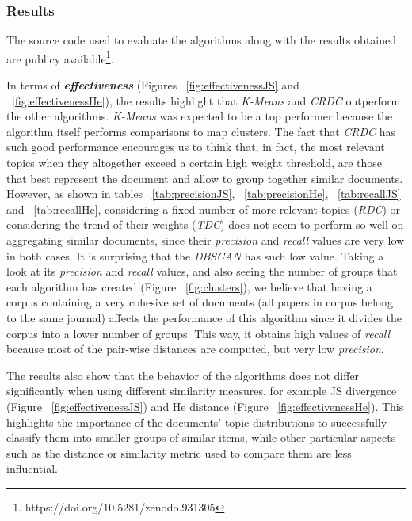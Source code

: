 \subsubsection{Results}
\label{sec:clustering-results}

The source code used to evaluate the algorithms along with the results obtained are publicy available\footnote{https://doi.org/10.5281/zenodo.931305}.

In terms of \textbf{\textit{effectiveness}} (Figures ~\ref{fig:effectivenessJS} and ~\ref{fig:effectivenessHe}), the results highlight that \textit{K-Means} and \textit{CRDC} outperform the other algorithms. \textit{K-Means} was expected to be a top performer because the algorithm itself performs comparisons to map clusters. The fact that \textit{CRDC} has such good performance encourages us to think that, in fact, the most relevant topics when they altogether exceed a certain high weight threshold, are those that best represent the document and allow to group together similar documents. However, as shown in tables ~\ref{tab:precisionJS}, ~\ref{tab:precisionHe}, ~\ref{tab:recallJS} and ~\ref{tab:recallHe}, considering a fixed number of more relevant topics (\textit{RDC}) or considering the trend of their weights (\textit{TDC}) does not seem to perform so well on aggregating similar documents, since their \textit{precision} and \textit{recall} values are very low in both cases. It is surprising that the \textit{DBSCAN} has such low value. Taking a look at its \textit{precision} and \textit{recall} values, and also seeing the number of groups that each algorithm has created (Figure ~\ref{fig:clusters}), we believe that having a corpus containing a very cohesive set of documents (all papers in corpus belong to the same journal) affects the performance of this algorithm since it divides the corpus into a lower number of groups. This way, it obtains high values of \textit{recall} because most of the pair-wise distances are computed, but very low \textit{precision}.

The results also show that the behavior of the algorithms does not differ significantly when using different similarity measures, for example JS divergence (Figure ~\ref{fig:effectivenessJS}) and He distance (Figure ~\ref{fig:effectivenessHe}). This highlights the importance of the documents' topic distributions to successfully classify them into smaller groups of similar items, while other particular aspects such as the distance or similarity metric used to compare them are less influential.

